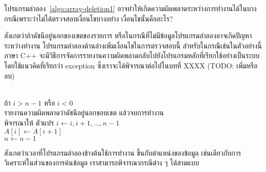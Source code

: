 \begin{quiz}{}
โปรแกรม{\wbr}ลำลอง~\ref{algo:array-deletion1}
อาจ{\wbr}ทำให้{\wbr}เกิด{\wbr}ความ{\wbr}ผิดพลาด{\wbr}ระหว่าง{\wbr}การ{\wbr}ทำงาน{\wbr}ได้{\wbr}ใน{\wbr}บาง{\wbr}กรณี{\wbr}เพราะ{\wbr}ว่า{\wbr}ไม่{\wbr}ได้{\wbr}ตรวจสอบ{\wbr}เงื่อนไข{\wbr}บาง{\wbr}อย่าง{\wbr}
เงื่อนไข{\wbr}นั้น{\wbr}คือ{\wbr}อะไร?
\end{quiz}

สังเกต{\wbr}ว่า{\wbr}ถ้า{\wbr}ดัชนี{\wbr}อยู่{\wbr}นอก{\wbr}ของ{\wbr}เขต{\wbr}ของ{\wbr}รายการ{\wbr}
หรือ{\wbr}ใน{\wbr}กรณี{\wbr}ที่{\wbr}ไม่{\wbr}มี{\wbr}ข้อมูล{\wbr}โปรแกรม{\wbr}ลำลอง{\wbr}อาจ{\wbr}เกิด{\wbr}ปัญหา{\wbr}ระหว่าง{\wbr}ทำงาน{\wbr}
โปรแกรม{\wbr}ลำลอง{\wbr}ด้าน{\wbr}ล่าง{\wbr}เพิ่ม{\wbr}เงื่อนไข{\wbr}ใน{\wbr}การ{\wbr}ตรวจสอบ{\wbr}นี้ สำหรับ{\wbr}ใน{\wbr}กรณี{\wbr}เช่น{\wbr}ใน{\wbr}ตัวอย่าง{\wbr}นี้ ภาษา{\wbr}
C++ จะ{\wbr}มี{\wbr}วิธีการ{\wbr}จัดการ{\wbr}รายงาน{\wbr}ความ{\wbr}ผิดพลาด{\wbr}กลับ{\wbr}ไป{\wbr}ยัง{\wbr}โปรแกรม{\wbr}หลัก{\wbr}ที่{\wbr}เรียก{\wbr}ใช้{\wbr}อย่าง{\wbr}เป็น{\wbr}ระบบ{\wbr}
โดย{\wbr}ใช้{\wbr}แนวคิด{\wbr}ที่{\wbr}เรียก{\wbr}ว่า exception ซึ่ง{\wbr}เรา{\wbr}จะ{\wbr}ได้{\wbr}พิจารณา{\wbr}ต่อ{\wbr}ไป{\wbr}ใน{\wbr}บท{\wbr}ที่ XXXX (TODO:
เพิ่ม{\wbr}หรือ{\wbr}ลบ)

\begin{algt}
\label{algo:array-deletion2}
\\
\hspace*{0.2in} ถ้า $i > n-1$ หรือ $i < 0$\\
\hspace*{0.2in}\hspace*{0.2in} รายงาน{\wbr}ความ{\wbr}ผิดพลาด{\wbr}ว่า{\wbr}ดัชนี{\wbr}อยู่{\wbr}นอก{\wbr}ขอบเขต แล้ว{\wbr}จบ{\wbr}การ{\wbr}ทำงาน\\
\hspace*{0.2in} พิจารณา{\wbr}ให้ ตัวแปร $i\leftarrow i,i+1,\ldots,n-1$\\
\hspace*{0.2in}\hspace*{0.2in} $A[i]\leftarrow A[i+1]$\\
\hspace*{0.2in} $n\leftarrow n-1$
\end{algt}

สังเกต{\wbr}ว่า{\wbr}เวลา{\wbr}ที่{\wbr}โปรแกรม{\wbr}ลำลอง{\wbr}ข้าง{\wbr}ต้น{\wbr}ใช้{\wbr}การ{\wbr}ทำงาน ขึ้น{\wbr}กับ{\wbr}ตำแหน่ง{\wbr}ของ{\wbr}ข้อมูล{\wbr}
เช่น{\wbr}เดียว{\wbr}กับ{\wbr}การ{\wbr}วิเคราะห์{\wbr}ใน{\wbr}ส่วน{\wbr}ของ{\wbr}การ{\wbr}ค้น{\wbr}ข้อมูล เรา{\wbr}สามารถ{\wbr}พิจารณา{\wbr}กรณี{\wbr}ต่าง ๆ ได้{\wbr}สาม{\wbr}แบบ{\wbr}

